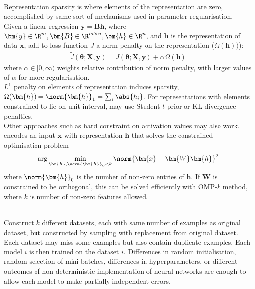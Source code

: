 \begin{remark} \\
Representation sparsity is where elements of the representation are zero, accomplished by same sort of mechanisms used in parameter regularisation.\\
Given a linear regression $\bm{y} = \bm{B} \bm{h}$, where $\bm{y} \in \R^m, \bm{B} \in \R^{m \times n}, \bm{h} \in \R^n$, and $\bm{h}$ is the representation of data $\bm{x}$, add to loss function $J$ a norm penalty on the representation ($\Omega(\bm{h}))$):
\begin{align}
\tilde{J}(\bm{\theta}; \bm{X}, \bm{y}) = J(\bm{\theta}; \bm{X}, \bm{y}) + \alpha \Omega (\bm{h}) \nonumber
\end{align}
where $\alpha \in [0, \infty)$ weights relative contribution of norm penalty, with larger values of $\alpha$ for more regularisation.\\
$L^1$ penalty on elements of representation induces sparsity, $\Omega(\bm{h}) = \norm{\bm{h}}_1 = \sum_i \abs{h_i}$. For representations with elements constrained to lie on unit interval, may use Student-$t$ prior or KL divergence penalties.\\
Other approaches such as hard constraint on activation values may also work.  encodes an input $\bm{x}$ with representation $\bm{h}$ that solves the constrained optimisation problem
\begin{align}
\arg \min_{\bm{h}, \norm{\bm{h}}_0 < k} \norm{\bm{x} - \bm{W} \bm{h}}^2 \nonumber
\end{align}
where $\norm{\bm{h}}_0$ is the number of non-zero entries of $\bm{h}$. If $\bm{W}$ is constrained to be orthogonal, this can be solved efficiently with OMP-$k$ method, where $k$ is number of non-zero features allowed.
\end{remark}

\begin{remark} \\
Construct $k$ different datasets, each with same number of examples as original dataset, but constructed by sampling with replacement from original dataset. Each dataset may miss some examples but also contain duplicate examples. Each model $i$ is then trained on the dataset $i$. Differences in random initialisation, random selection of mini-batches, differences in hyperparameters, or different outcomes of non-deterministic implementation of neural networks are enough to allow each model to make partially independent errors.
\end{remark}

